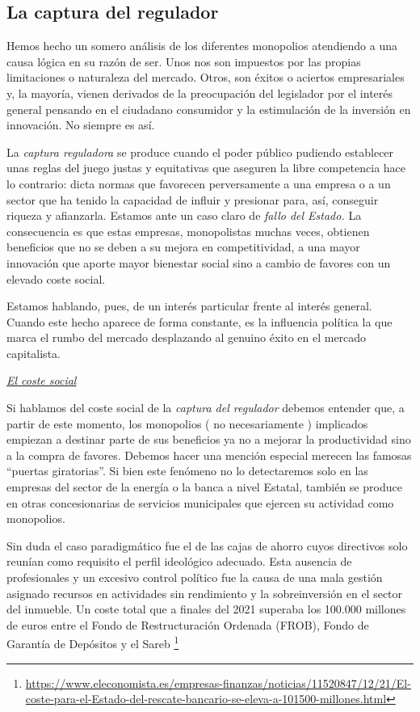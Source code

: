 \documentclass[
]{article}
\begin{document}
\hypertarget{la-captura-del-regulador}{%
\subsection{La captura del regulador}\label{la-captura-del-regulador}}

Hemos hecho un somero análisis de los diferentes monopolios atendiendo a
una causa lógica en su razón de ser. Unos nos son impuestos por las
propias limitaciones o naturaleza del mercado. Otros, son éxitos o
aciertos empresariales y, la mayoría, vienen derivados de la
preocupación del legislador por el interés general pensando en el
ciudadano consumidor y la estimulación de la inversión en innovación. No
siempre es así.

La \emph{captura reguladora} se produce cuando el poder público pudiendo
establecer unas reglas del juego justas y equitativas que aseguren la
libre competencia hace lo contrario: dicta normas que favorecen
perversamente a una empresa o a un sector que ha tenido la capacidad de
influir y presionar para, así, conseguir riqueza y afianzarla. Estamos
ante un caso claro de \emph{fallo del Estado.} La consecuencia es que
estas empresas, monopolistas muchas veces, obtienen beneficios que no se
deben a su mejora en competitividad, a una mayor innovación que aporte
mayor bienestar social sino a cambio de favores con un elevado coste
social.

Estamos hablando, pues, de un interés particular frente al interés
general. Cuando este hecho aparece de forma constante, es la influencia
política la que marca el rumbo del mercado desplazando al genuino éxito
en el mercado capitalista.

\emph{\ul{El coste social}}

Si hablamos del coste social de la \emph{captura del regulador} debemos
entender que, a partir de este momento, los monopolios ( no
necesariamente ) implicados empiezan a destinar parte de sus beneficios
ya no a mejorar la productividad sino a la compra de favores. Debemos
hacer una mención especial merecen las famosas ``puertas giratorias''.
Si bien este fenómeno no lo detectaremos solo en las empresas del sector
de la energía o la banca a nivel Estatal, también se produce en otras
concesionarias de servicios municipales que ejercen su actividad como
monopolios.

Sin duda el caso paradigmático fue el de las cajas de ahorro cuyos
directivos solo reunían como requisito el perfil ideológico adecuado.
Esta ausencia de profesionales y un excesivo control político fue la
causa de una mala gestión asignado recursos en actividades sin
rendimiento y la sobreinversión en el sector del inmueble. Un coste
total que a finales del 2021 superaba los 100.000 millones de euros
entre el Fondo de Restructuración Ordenada (FROB), Fondo de Garantía de
Depósitos y el Sareb \footnote{\url{https://www.eleconomista.es/empresas-finanzas/noticias/11520847/12/21/El-coste-para-el-Estado-del-rescate-bancario-se-eleva-a-101500-millones.html}}
\end{document}
